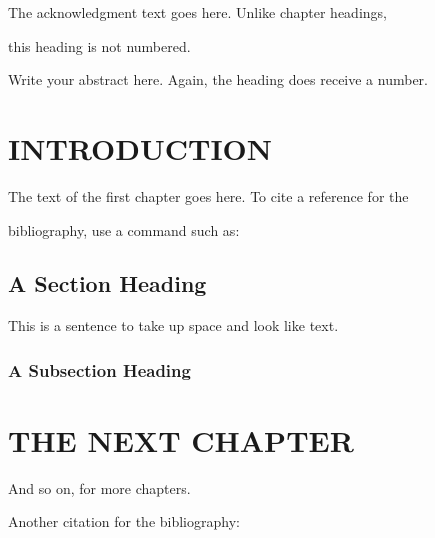 \documentclass{thesis}
\author{Sir Isaac Newton}
\begin{document}
 

\titlepage             %


\tableofcontents       %

\listoftables          %

\listoffigures         %




The acknowledgment text goes here. Unlike chapter headings, 

this heading is not numbered.




Write your abstract here. Again, the heading does receive a number.



\chapter{INTRODUCTION}

The text of the first chapter goes here. To cite a reference for the

bibliography, use a command such as:\cite{thisbook}

\section{A Section Heading}

This is a sentence to take up space and look like text.

\subsection{A Subsection Heading}



\chapter{THE NEXT CHAPTER}

And so on, for more chapters.

Another citation for the bibliography:\cite{anotherbook}




\end{document}
